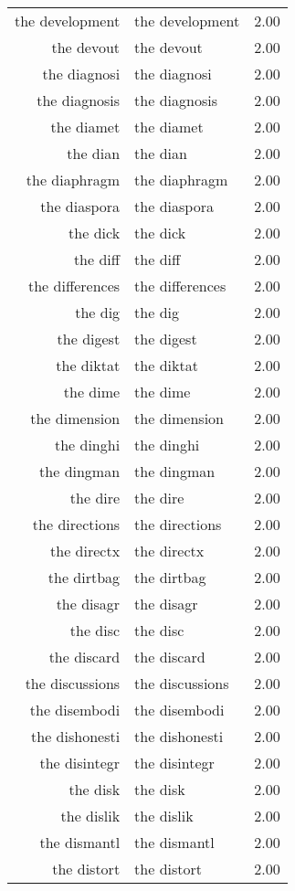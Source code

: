 \begin{table}[ht]
\begin{tabular}{rlr}
  the development & the development & 2.00 \\ 
  the devout & the devout & 2.00 \\ 
  the diagnosi & the diagnosi & 2.00 \\ 
  the diagnosis & the diagnosis & 2.00 \\ 
  the diamet & the diamet & 2.00 \\ 
  the dian & the dian & 2.00 \\ 
  the diaphragm & the diaphragm & 2.00 \\ 
  the diaspora & the diaspora & 2.00 \\ 
  the dick & the dick & 2.00 \\ 
  the diff & the diff & 2.00 \\ 
  the differences & the differences & 2.00 \\ 
  the dig & the dig & 2.00 \\ 
  the digest & the digest & 2.00 \\ 
  the diktat & the diktat & 2.00 \\ 
  the dime & the dime & 2.00 \\ 
  the dimension & the dimension & 2.00 \\ 
  the dinghi & the dinghi & 2.00 \\ 
  the dingman & the dingman & 2.00 \\ 
  the dire & the dire & 2.00 \\ 
  the directions & the directions & 2.00 \\ 
  the directx & the directx & 2.00 \\ 
  the dirtbag & the dirtbag & 2.00 \\ 
  the disagr & the disagr & 2.00 \\ 
  the disc & the disc & 2.00 \\ 
  the discard & the discard & 2.00 \\ 
  the discussions & the discussions & 2.00 \\ 
  the disembodi & the disembodi & 2.00 \\ 
  the dishonesti & the dishonesti & 2.00 \\ 
  the disintegr & the disintegr & 2.00 \\ 
  the disk & the disk & 2.00 \\ 
  the dislik & the dislik & 2.00 \\ 
  the dismantl & the dismantl & 2.00 \\ 
  the distort & the distort & 2.00 \\ 

\end{tabular}
\end{table}
